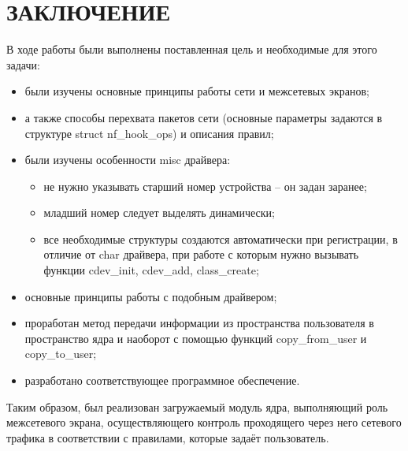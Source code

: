 \section*{ЗАКЛЮЧЕНИЕ}

В ходе работы были выполнены поставленная цель и необходимые для этого задачи:
\begin{itemize}
	\item были изучены основные принципы работы сети и межсетевых экранов;

	\item а также способы перехвата пакетов сети (основные параметры задаются в структуре struct nf\_hook\_ops) и описания правил;
	
	\item были изучены особенности misc драйвера:
	\begin{itemize}
		\item не нужно указывать старший номер устройства -- он задан заранее;
		
		\item младший номер следует выделять динамически;
		
		\item все необходимые структуры создаются автоматически при регистрации, в отличие от char драйвера, при работе с которым нужно вызывать функции cdev\_init, cdev\_add, class\_create;
	\end{itemize}

	\item основные принципы работы с подобным драйвером;
	
	\item проработан метод передачи информации из пространства пользователя в пространство ядра и наоборот с помощью функций copy\_from\_user и copy\_to\_user;
	
	\item разработано соответствующее программное обеспечение.\newline
\end{itemize}

Таким образом, был реализован загружаемый модуль ядра, выполняющий роль межсетевого экрана, осуществляющего контроль проходящего через него сетевого трафика в соответствии с правилами, которые задаёт пользователь. 

\pagebreak
